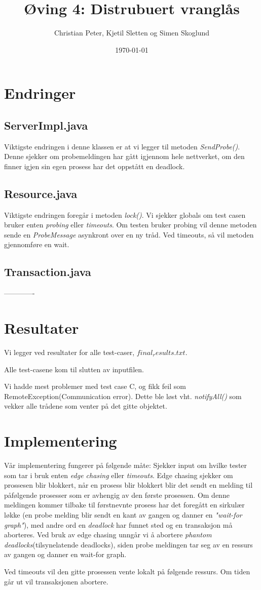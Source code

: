 \documentclass{article}
\begin{document}
\title{Øving 4: Distrubuert vranglås}
\author{Christian Peter, Kjetil Sletten og Simen Skoglund}
\date{\today}
\maketitle
\section{Endringer}
\subsection*{ServerImpl.java}
Viktigste endringen i denne klassen er at vi legger til metoden \emph{SendProbe()}. Denne sjekker om probemeldingen har gått igjennom hele nettverket, om den finner igjen sin egen prosess har det oppstått en deadlock.
\subsection*{Resource.java}
Viktigste endringen foregår i metoden \emph{lock()}. Vi sjekker globals om test casen bruker enten \emph{probing} eller \emph{timeouts}. Om testen bruker probing vil denne metoden sende en \emph{ProbeMessage} asynkront over en ny tråd. Ved timeouts, så vil metoden gjennomføre en wait.
\subsection*{Transaction.java}
-------------
\section{Resultater}
Vi legger ved resultater for alle test-caser, $final_results.txt$. 

Alle test-casene kom til slutten av inputfilen.

Vi hadde mest problemer med test case C, og fikk feil som RemoteException(Communication error). Dette ble løst vht. \emph{notifyAll()} som vekker alle trådene som venter på det gitte objektet.

\section{Implementering}
Vår implementering fungerer på følgende måte: Sjekker input om hvilke tester som tar i bruk enten \emph{edge chasing} eller \emph{timeouts}. Edge chasing sjekker om prossesen blir blokkert, når en prosess blir blokkert blir det sendt en melding til påfølgende prosesser som er avhengig av den første prosessen. Om denne meldingen kommer tilbake til førstnevnte prosess har det foregått en sirkulær løkke (en probe melding blir sendt en kant av gangen og danner en \emph{"wait-for graph"}), med andre ord en \emph{deadlock} har funnet sted og en transaksjon må aborteres. Ved bruk av edge chasing unngår vi å abortere \emph{phantom deadlocks}(tilsynelatende deadlocks), siden probe meldingen tar seg av en ressurs av gangen og danner en wait-for graph. 

Ved timeouts vil den gitte prosessen vente lokalt på følgende ressurs. Om tiden går ut vil transaksjonen abortere. 
\end{document}
